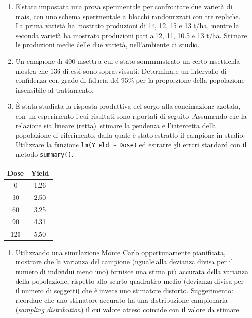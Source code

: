\documentclass[
  12pt,
]{book}
\providecommand{\tightlist}{%
  \setlength{\itemsep}{0pt}\setlength{\parskip}{0pt}}
\begin{document}
\begin{enumerate}
\def\labelenumi{\arabic{enumi}.}
\setcounter{enumi}{2}
\tightlist
\item
  E'stata impostata una prova sperimentale per confrontare due varietà di mais, con uno schema sperimentale a blocchi randomizzati con tre repliche. La prima varietà ha mostrato produzioni di 14, 12, 15 e 13 t/ha, mentre la seconda varietà ha mostrato produzioni pari a 12, 11, 10.5 e 13 t/ha. Stimare le produzioni medie delle due varietà, nell'ambiente di studio.
\item
  Un campione di 400 insetti a cui è stato somministrato un certo insetticida mostra che 136 di essi sono sopravvissuti. Determinare un intervallo di confidenza con grado di fiducia del 95\% per la proporzione della popolazione insensibile al trattamento.
\item
  È stata studiata la risposta produttiva del sorgo alla concimazione azotata, con un esperimento i cui risultati sono riportati di seguito .Assumendo che la relazione sia lineare (retta), stimare la pendenza e l'intercetta della popolazione di riferimento, dalla quale è stato estratto il campione in studio. Utilizzare la funzione \texttt{lm(Yield\ \textasciitilde{}\ Dose)} ed estrarre gli errori standard con il metodo \texttt{summary()}.
\end{enumerate}

\begin{longtable}[]{@{}cc@{}}
\toprule()
Dose & Yield \\
\midrule()
\endhead
0 & 1.26 \\
30 & 2.50 \\
60 & 3.25 \\
90 & 4.31 \\
120 & 5.50 \\
\bottomrule()
\end{longtable}

\begin{enumerate}
\def\labelenumi{\arabic{enumi}.}
\setcounter{enumi}{5}
\tightlist
\item
  Utilizzando una simulazione Monte Carlo opportunamente pianificata, mostrare che la varianza del campione (uguale alla devianza divisa per il numero di individui meno uno) fornisce una stima più accurata della varianza della popolazione, rispetto allo scarto quadratico medio (devianza divisa per il numero di soggetti) che è invece uno stimatore distorto. Suggerimento: ricordare che uno stimatore accurato ha una distribuzione campionaria (\emph{sampling distribution}) il cui valore atteso coincide con il valore da stimare.
\end{enumerate}
\end{document}
